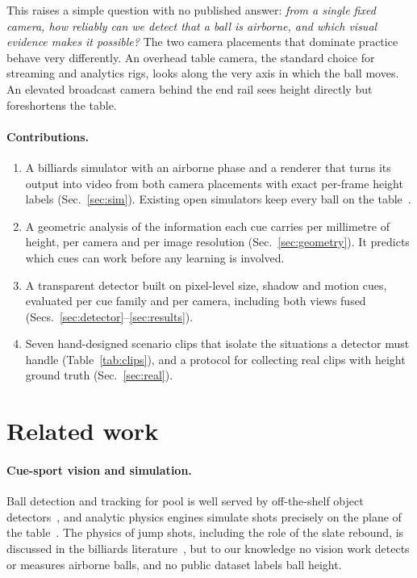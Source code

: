 \documentclass[11pt]{article}
\begin{document}
This raises a simple question with no published answer: \emph{from a
single fixed camera, how reliably can we detect that a ball is airborne,
and which visual evidence makes it possible?} The two camera placements that
dominate practice behave very differently. An overhead table camera, the
standard choice for streaming and analytics rigs, looks along the very axis
in which the ball moves. An elevated broadcast camera behind the end rail
sees height directly but foreshortens the table.

\paragraph{Contributions.}
\begin{enumerate}
  \item A billiards simulator with an airborne phase and a renderer that turns
        its output into video from both camera placements with exact per-frame
        height labels (Sec.~\ref{sec:sim}). Existing open simulators keep every
        ball on the table~\citep{kiefl2024pooltool}.
  \item A geometric analysis of the information each cue carries per
        millimetre of height, per camera and per image resolution
        (Sec.~\ref{sec:geometry}). It predicts which cues can work before any
        learning is involved.
  \item A transparent detector built on pixel-level size, shadow and motion cues,
        evaluated per cue family and per camera, including both views fused
        (Secs.~\ref{sec:detector}--\ref{sec:results}).
  \item Seven hand-designed scenario clips that isolate the situations a
        detector must handle (Table~\ref{tab:clips}), and a protocol for
        collecting real clips with height ground truth (Sec.~\ref{sec:real}).
\end{enumerate}

\section{Related work}

\paragraph{Cue-sport vision and simulation.}
Ball detection and tracking for pool is well served by off-the-shelf object
detectors~\citep{roboflow2023pool}, and analytic physics engines simulate
shots precisely on the plane of the table~\citep{leckie2006event,kiefl2024pooltool}.
The physics of jump shots, including the role of the slate rebound, is
discussed in the billiards literature~\citep{marlow1995physics,alciatore_tpb10},
but to our knowledge no vision work detects or measures airborne balls, and
no public dataset labels ball height.
\end{document}
